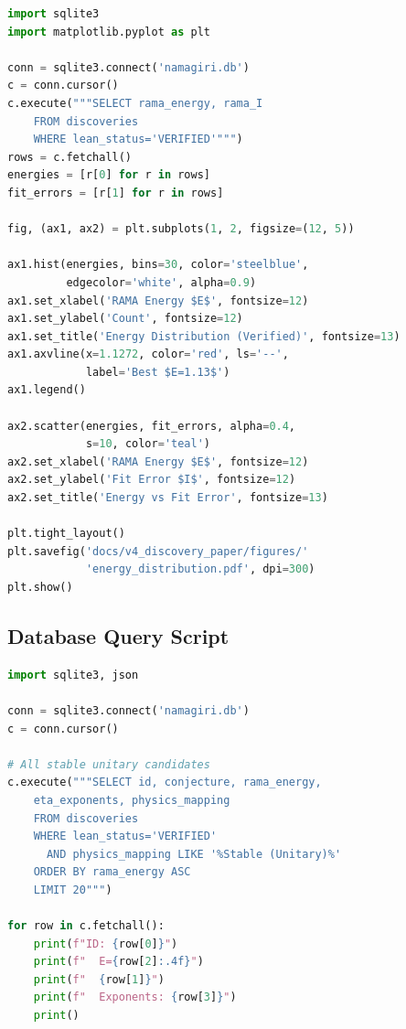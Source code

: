 \begin{lstlisting}[language=Python, caption={Energy
  distribution visualization of verified candidates.}]
import sqlite3
import matplotlib.pyplot as plt

conn = sqlite3.connect('namagiri.db')
c = conn.cursor()
c.execute("""SELECT rama_energy, rama_I
    FROM discoveries
    WHERE lean_status='VERIFIED'""")
rows = c.fetchall()
energies = [r[0] for r in rows]
fit_errors = [r[1] for r in rows]

fig, (ax1, ax2) = plt.subplots(1, 2, figsize=(12, 5))

ax1.hist(energies, bins=30, color='steelblue',
         edgecolor='white', alpha=0.9)
ax1.set_xlabel('RAMA Energy $E$', fontsize=12)
ax1.set_ylabel('Count', fontsize=12)
ax1.set_title('Energy Distribution (Verified)', fontsize=13)
ax1.axvline(x=1.1272, color='red', ls='--',
            label='Best $E=1.13$')
ax1.legend()

ax2.scatter(energies, fit_errors, alpha=0.4,
            s=10, color='teal')
ax2.set_xlabel('RAMA Energy $E$', fontsize=12)
ax2.set_ylabel('Fit Error $I$', fontsize=12)
ax2.set_title('Energy vs Fit Error', fontsize=13)

plt.tight_layout()
plt.savefig('docs/v4_discovery_paper/figures/'
            'energy_distribution.pdf', dpi=300)
plt.show()
\end{lstlisting}

\subsection{Database Query Script}

\begin{lstlisting}[language=Python, caption={Database
  query for verified stable candidates.}]
import sqlite3, json

conn = sqlite3.connect('namagiri.db')
c = conn.cursor()

# All stable unitary candidates
c.execute("""SELECT id, conjecture, rama_energy,
    eta_exponents, physics_mapping
    FROM discoveries
    WHERE lean_status='VERIFIED'
      AND physics_mapping LIKE '%Stable (Unitary)%'
    ORDER BY rama_energy ASC
    LIMIT 20""")

for row in c.fetchall():
    print(f"ID: {row[0]}")
    print(f"  E={row[2]:.4f}")
    print(f"  {row[1]}")
    print(f"  Exponents: {row[3]}")
    print()
\end{lstlisting}
